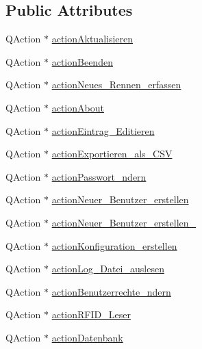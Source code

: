 \subsection*{Public Attributes}
\begin{CompactItemize}
\item 
QAction $\ast$ \hyperlink{class_ui___b_e_o___timing_class_6eea06afd3edb89e9f795eeb0200179a}{actionAktualisieren}
\item 
QAction $\ast$ \hyperlink{class_ui___b_e_o___timing_class_02af051353694da32aca2f3c4784b4f5}{actionBeenden}
\item 
QAction $\ast$ \hyperlink{class_ui___b_e_o___timing_class_9b18475876f8bdefc32029c20f03d2dc}{actionNeues\_\-Rennen\_\-erfassen}
\item 
QAction $\ast$ \hyperlink{class_ui___b_e_o___timing_class_6729c44a373294e3a925a7e2410db678}{actionAbout}
\item 
QAction $\ast$ \hyperlink{class_ui___b_e_o___timing_class_03f22fbfb4e131463c67bcd71bf6c8ab}{actionEintrag\_\-Editieren}
\item 
QAction $\ast$ \hyperlink{class_ui___b_e_o___timing_class_d8c3dfc7a32aaca85ec882f6095e769a}{actionExportieren\_\-als\_\-CSV}
\item 
QAction $\ast$ \hyperlink{class_ui___b_e_o___timing_class_a1d2e32aefdb7aa24d0403f01d58a715}{actionPasswort\_\-ndern}
\item 
QAction $\ast$ \hyperlink{class_ui___b_e_o___timing_class_4e742eca416a99a53d690ac851cf049e}{actionNeuer\_\-Benutzer\_\-erstellen}
\item 
QAction $\ast$ \hyperlink{class_ui___b_e_o___timing_class_58256a822fe74b070f31c7c15d59c382}{actionNeuer\_\-Benutzer\_\-erstellen\_}
\item 
QAction $\ast$ \hyperlink{class_ui___b_e_o___timing_class_39d8c06d28695c5372839d9b8017f153}{actionKonfiguration\_\-erstellen}
\item 
QAction $\ast$ \hyperlink{class_ui___b_e_o___timing_class_19d90e63709c1a938c5fef1a889775ac}{actionLog\_\-Datei\_\-auslesen}
\item 
QAction $\ast$ \hyperlink{class_ui___b_e_o___timing_class_94c7159e426b9ebbafe93728014bd305}{actionBenutzerrechte\_\-ndern}
\item 
QAction $\ast$ \hyperlink{class_ui___b_e_o___timing_class_d5ff0108e29b7b18abdcd64e61b6828a}{actionRFID\_\-Leser}
\item 
QAction $\ast$ \hyperlink{class_ui___b_e_o___timing_class_d4f5ee280c8e806064dc61da9aeb8a07}{actionDatenbank}
\item 

\end{CompactItemize}
